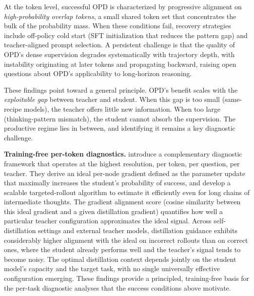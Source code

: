 \documentclass{article} %
\begin{document}
At the token level, successful OPD is characterized by progressive alignment on \emph{high-probability overlap tokens}, a small shared token set that concentrates the bulk of the probability mass. When these conditions fail, recovery strategies include off-policy cold start (SFT initialization that reduces the pattern gap) and teacher-aligned prompt selection. A persistent challenge is that the quality of OPD's dense supervision degrades systematically with trajectory depth, with instability originating at later tokens and propagating backward, raising open questions about OPD's applicability to long-horizon reasoning.

These findings point toward a general principle. OPD's benefit scales with the \emph{exploitable gap} between teacher and student. When this gap is too small (same-recipe models), the teacher offers little new information. When too large (thinking-pattern mismatch), the student cannot absorb the supervision. The productive regime lies in between, and identifying it remains a key diagnostic challenge.

\textbf{Training-free per-token diagnostics.} \citet{2605.10889} introduce a complementary diagnostic framework that operates at the highest resolution, per token, per question, per teacher. They derive an ideal per-node gradient defined as the parameter update that maximally increases the student's probability of success, and develop a scalable targeted-rollout algorithm to estimate it efficiently even for long chains of intermediate thoughts. The gradient alignment score (cosine similarity between this ideal gradient and a given distillation gradient) quantifies how well a particular teacher configuration approximates the ideal signal. Across self-distillation settings and external teacher models, distillation guidance exhibits considerably higher alignment with the ideal on incorrect rollouts than on correct ones, where the student already performs well and the teacher's signal tends to become noisy. The optimal distillation context depends jointly on the student model's capacity and the target task, with no single universally effective configuration emerging. These findings provide a principled, training-free basis for the per-task diagnostic analyses that the success conditions above motivate.
\end{document}

